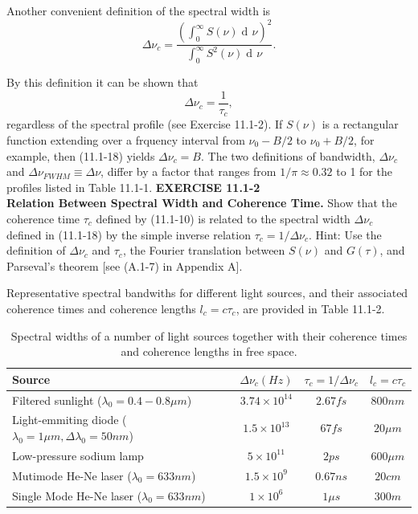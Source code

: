 \documentclass{article}
\newcommand\crule[3][black]{\textcolor{#1}{\rule{#2}{#3}}}
\numberwithin{figure}{subsection}
\numberwithin{table}{subsection}
\DeclareMathOperator\dif{d\!}
\begin{document}
\par Another convenient definition of the spectral width is
\begin{equation}
\Delta \nu_c = \frac{(\int_0^\infty S(\nu) \dif \nu)^2}{\int_0^\infty S^2(\nu) \dif \nu}.
\end{equation}
\par By this definition it can be shown that
\begin{equation}
\Delta \nu_c = \frac{1}{\tau_c},
\end{equation}
regardless of the spectral profile (see Exercise 11.1-2). If $ S(\nu) $ is a rectangular function extending over a frquency interval from $ \nu_0 - B/2 $ to $ \nu_0 + B/2 $, for example, then (11.1-18) yields $ \Delta \nu_c = B $. The two definitions of bandwidth, $ \Delta \nu_c $ and $ \Delta \nu_{FWHM} \equiv \Delta \nu $, differ by a factor that ranges from $1/\pi \approx 0.32 $ to 1 for the profiles listed in Table 11.1-1.
\bigbreak\noindent{\crule[ksc]{\textwidth}{0.2cm}}
\textbf{EXERCISE 11.1-2} \\
\textbf{Relation Between Spectral Width and Coherence Time.} Show that the coherence time $ \tau_c $ defined by (11.1-10) is related to the spectral width $ \Delta \nu_c $ defined in (11.1-18) by the simple inverse relation $ \tau_c = 1/ \Delta \nu_c $. Hint: Use the definition of $ \Delta \nu_c $ and  $ \tau_c $, the Fourier translation between $ S(\nu) $ and $ G(\tau) $, and Parseval's theorem [see (A.1-7) in Appendix A].\\
\noindent{\crule[ksc]{\textwidth}{0.2cm}}
\par Representative spectral bandwiths for different light sources, and their associated coherence times and coherence lengths $ l_c = c\tau_c$, are provided in Table 11.1-2.
\begin{table}[H]
\caption{Spectral widths of a number of light sources together with their coherence times and coherence lengths in free space.}
\begin{center}
\begin{tabular}{lccc}
\hline
Source & $ \Delta \nu_c (Hz) $ & $ \tau_c = 1/\Delta \nu_c $ & $ l_c = c\tau_c $ \\
\hline
Filtered sunlight ($ \lambda_0 = 0.4-0.8 \mu m $) & $ 3.74\times 10^14 $ & $ 2.67 fs $ & $ 800 nm $ \\
Light-emmiting diode ($ \lambda_0 = 1\mu m, \Delta \lambda_0 = 50 nm $) & $ 1.5\times 10^13 $ & $ 67 fs$ & $ 20 \mu m $ \\
Low-pressure sodium lamp & $ 5\times 10^11 $ & $ 2 ps $ & $ 600 \mu m $ \\
Mutimode He-Ne laser ($ \lambda_0 = 633 nm $) & $ 1.5 \times 10^9 $ & $ 0.67 ns $ & $ 20 cm $ \\
Single Mode He-Ne laser ($ \lambda_0 = 633 nm $) & $ 1\times 10^6 $ & $ 1 \mu s $ & $ 300 m $ \\
\hline
\end{tabular}
\end{center}
\end{table}
\end{document}

